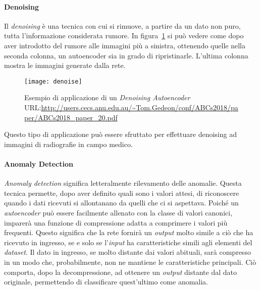 \paragraph{Denoising}
Il \textit{denoising} è una tecnica con cui si rimuove, a partire da un dato non puro, tutta l'informazione considerata rumore.
In figura~\ref{fig:denoise_example} si può vedere come dopo aver introdotto del rumore alle immagini più a sinistra, ottenendo quelle nella seconda colonna, un autoencoder sia in grado di ripristinarle.
L'ultima colonna mostra le immagini generate dalla rete.
\begin{figure}[ht]
  \begin{center}
    \texttt{[image: denoise]}
  \end{center}
  \caption{Esempio di applicazione di un \textit{Denoising Autoencoder} URL:\url{http://users.cecs.anu.edu.au/~Tom.Gedeon/conf/ABCs2018/paper/ABCs2018_paper_20.pdf}}
  \label{fig:denoise_example}
\end{figure}
Questo tipo di applicazione può essere sfruttato per effettuare denoising ad immagini di radiografie in campo medico.


\paragraph{Anomaly Detection}
\textit{Anomaly detection} significa letteralmente rilevamento delle anomalie.
Questa tecnica permette, dopo aver definito quali sono i valori attesi, di riconoscere quando i dati ricevuti si allontanano da quelli che ci si aspettava.
Poiché un \textit{autoencoder} può essere facilmente allenato con la classe di valori canonici, imparerà una funzione di compressione adatta a comprimere i valori più frequenti.
Questo significa che la rete fornirà un \textit{output} molto simile a ciò che ha ricevuto in ingresso, se e solo se l'\textit{input} ha caratteristiche simili agli elementi del \textit{dataset}.
Il dato in ingresso, se molto distante dai valori abituali, sarà compresso in un modo che, probabilmente, non ne mantiene le caratteristiche principali.
Ciò comporta, dopo la decompressione, ad ottenere un \textit{output} distante dal dato originale, permettendo di classificare quest'ultimo come anomalia.
